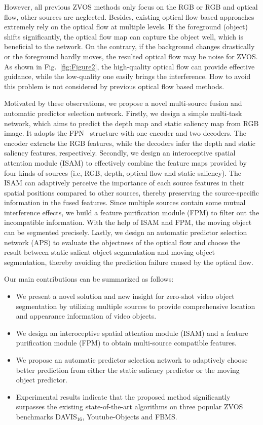 \documentclass[sigconf]{acmart}
\begin{document}
However, all previous ZVOS methods only focus on the RGB or RGB and optical flow, other sources are neglected. Besides, existing optical flow based approaches extremely rely on the optical flow at multiple levels. If the foreground (object) shifts significantly, the optical flow map can capture the object well, which is beneficial to the network. On the contrary, if the background changes drastically or the foreground hardly moves, the resulted optical flow may be noise for ZVOS. As shown in Fig.~\ref{fig:Figure2}, the high-quality optical flow can provide effective guidance, while the low-quality one easily brings the interference. How to avoid this problem is not considered by previous optical flow based methods.

Motivated by these observations, we propose a novel multi-source fusion and automatic predictor selection network. 
Firstly, we design a simple multi-task network, which aims to predict the depth map and static saliency map from RGB image. It adopts the FPN~\cite{FPN} structure with one encoder and two decoders. The encoder extracts the RGB features, while the decoders infer the depth and static saliency features, respectively.
Secondly, we design an interoceptive spatial attention module (ISAM) to effectively combine the feature maps provided by four kinds of sources (i.e, RGB, depth, optical flow and static saliency). 
The ISAM can adaptively perceive the importance of each source features in their spatial positions compared to other sources, thereby preserving the source-specific information in the fused features. 
Since multiple sources  contain some mutual interference effects, we build a feature purification module (FPM) 
to filter out the incompatible information. With the help of ISAM and FPM, the moving object can be segmented precisely.
Lastly, we design an automatic predictor selection network (APS) to evaluate the objectness of the optical flow and choose the result between static salient object segmentation and moving
object segmentation, thereby avoiding the prediction failure caused by the optical flow.

Our main contributions can be summarized as follows:
\begin{itemize}
     \item  We present a novel solution and new insight for  zero-shot video object segmentation by utilizing multiple sources to provide comprehensive location and appearance information of video objects.
     
    \item  We design an interoceptive spatial attention module (ISAM) and a feature purification module (FPM) to obtain multi-source compatible features.
   
     \item We propose an  automatic predictor selection network to adaptively choose better prediction from either the static saliency predictor or the moving object predictor. 
    
    \item Experimental results indicate that the proposed method significantly surpasses the existing state-of-the-art algorithms on three popular ZVOS benchmarks DAVIS$_{16}$, Youtube-Objects and FBMS.
\end{itemize}
\end{document}
